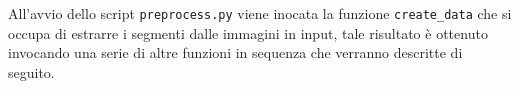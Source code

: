 All’avvio dello script \texttt{preprocess.py} viene inocata la funzione \texttt{create\_data} che si occupa di estrarre i segmenti dalle immagini in input, tale risultato è ottenuto invocando una serie di altre funzioni in sequenza che verranno descritte di seguito.
